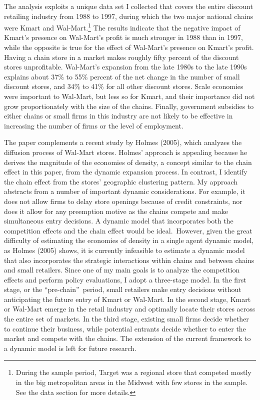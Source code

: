 \documentclass[notitlepage,onecolumn,11pt]{article}
\begin{document}
The analysis exploits a unique data set I collected that covers the entire
discount retailing industry from 1988 to 1997, during which the two major
national chains were Kmart and Wal-Mart.\footnote{%
During the sample period, Target was a regional store that competed mostly
in the big metropolitan areas in the Midwest with few stores in the sample.
See the data section for more details.} The results indicate that the
negative impact of Kmart's presence on Wal-Mart's profit is much stronger in
1988 than in 1997, while the opposite is true for the effect of Wal-Mart's
presence on Kmart's profit. Having a chain store in a market makes roughly
fifty percent of the discount stores unprofitable. Wal-Mart's expansion from
the late 1980s to the late 1990s explains about 37\% to 55\% percent of the
net change in the number of small discount stores, and 34\% to 41\% for all
other discount stores. Scale economies were important to Wal-Mart, but less
so for Kmart, and their importance did not grow proportionately with the
size of the chains. Finally, government subsidies to either chains or small
firms in this industry are not likely to be effective in increasing the
number of firms or the level of employment.

The paper complements a recent study by Holmes (2005), which analyzes the
diffusion process of Wal-Mart stores. Holmes' approach is appealing because
he derives the magnitude of the economies of density, a concept similar to
the chain effect in this paper, from the dynamic expansion process. In
contrast, I identify the chain effect from the stores' geographic clustering
pattern. My approach abstracts from a number of important dynamic
considerations. For example, it does not allow firms to delay store openings
because of credit constraints, nor does it allow for any preemption motive
as the chains compete and make simultaneous entry decisions. A dynamic model
that incorporates both the competition effects and the chain effect would be
ideal.\ However, given the great difficulty of estimating the economies of
density in a single agent dynamic model, as Holmes (2005) shows, it is
currently infeasible to estimate a dynamic model that also incorporates the
strategic interactions within chains and between chains and small retailers.
Since one of my main goals is to analyze the competition effects and perform
policy evaluations, I adopt a three-stage model. In the first stage, or the
\textquotedblleft pre-chain\textquotedblright\ period, small retailers make
entry decisions without anticipating the future entry of Kmart or Wal-Mart.
In the second stage, Kmart or Wal-Mart emerge in the retail industry and
optimally locate their stores across the entire set of markets. In the third
stage, existing small firms decide whether to continue their business, while
potential entrants decide whether to enter the market and compete with the
chains. The extension of the current framework to a dynamic model is left
for future research.
\end{document}
